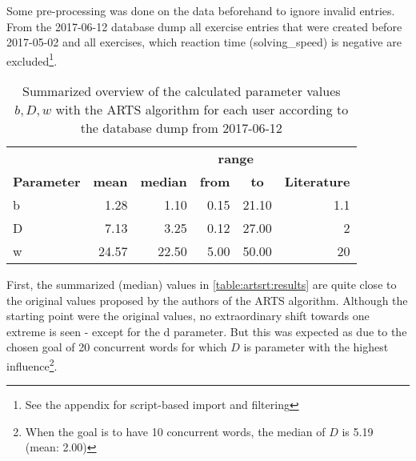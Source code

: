 \documentclass{article}
\begin{document}
Some pre-processing was done on the data beforehand to ignore invalid entries. From the 2017-06-12 database dump all exercise entries that were created before 2017-05-02 and all exercises, which reaction time (solving\_speed) is negative are excluded\footnote{See the appendix for script-based import and filtering}.

\begin{table}[H]
\centering
\begin{tabular}{lrrrr|r}
\multicolumn{1}{c}{\textbf{}}          & \multicolumn{1}{c}{\textbf{}}     & \multicolumn{1}{c}{\textbf{}}       & \multicolumn{2}{c}{\textbf{range}}                                  & \multicolumn{1}{c}{\textbf{}} \\
\multicolumn{1}{c}{\textbf{Parameter}} & \multicolumn{1}{c}{\textbf{mean}} & \multicolumn{1}{c}{\textbf{median}} & \multicolumn{1}{c}{\textbf{from}} & \multicolumn{1}{c}{\textbf{to}} & \multicolumn{1}{c}{\textbf{Literature}} \\
b                                      & 1.28                              & 1.10                                & 0.15                              & 21.10                           & 1.1 \\
D                                      & 7.13                              & 3.25                                & 0.12                              & 27.00                           & 2 \\
w                                      & 24.57                         & 22.50                               & 5.00                              & 50.00                           & 20 \\
\end{tabular}
\caption{Summarized overview of the calculated parameter values $b, D, w$ with the ARTS algorithm for each user according to the database dump from 2017-06-12}
\label{table:artsrt:results}
\end{table}

First, the summarized (median) values in \autoref{table:artsrt:results} are quite close to the original values proposed by the authors of the ARTS algorithm. Although the starting point were the original values, no extraordinary shift towards one extreme is seen - except for the d parameter. But this was expected as due to the chosen goal of 20 concurrent words for which $D$ is parameter with the highest influence\footnote{When the goal is to have 10 concurrent words, the median of $D$ is 5.19 (mean: 2.00)}.
\end{document}

